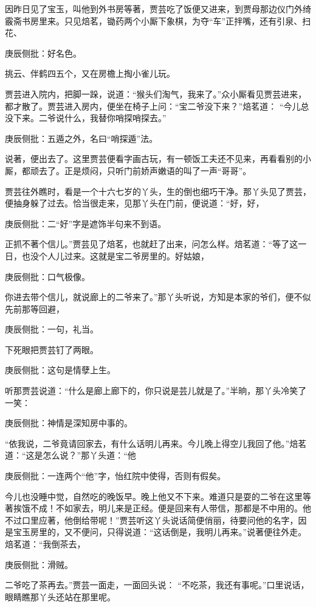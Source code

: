 \begin{parag}
    因昨日见了宝玉，叫他到外书房等著，贾芸吃了饭便又进来，到贾母那边仪门外绮霰斋书房里来。只见焙茗，锄药两个小厮下象棋，为夺“车”正拌嘴，还有引泉、扫花、\begin{note}庚辰侧批：好名色。\end{note}挑云、伴鹤四五个，又在房檐上掏小雀儿玩。
\end{parag}


\begin{parag}
    贾芸进入院内，把脚一跺，说道：“猴头们淘气，我来了。”众小厮看见贾芸进来，都才散了。贾芸进入房内，便坐在椅子上问：“宝二爷没下来？”焙茗道： “今儿总没下来。二爷说什么，我替你哨探哨探去。”\begin{note}庚辰侧批：五遁之外，名曰“哨探遁”法。\end{note}说著，便出去了。这里贾芸便看字画古玩，有一顿饭工夫还不见来，再看看别的小厮，都顽去了。正是烦闷，只听门前娇声嫩语的叫了一声“哥哥”。
\end{parag}


\begin{parag}
    贾芸往外瞧时，看是一个十六七岁的丫头，生的倒也细巧干净。那丫头见了贾芸，便抽身躲了过去。恰当很走来，见那丫头在门前，便说道：“好，好，\begin{note}庚辰侧批：二“好”字是遮饰半句来不到语。\end{note}正抓不著个信儿。”贾芸见了焙茗，也就赶了出来，问怎么样。焙茗道：“等了这一日，也没个人儿过来。这就是宝二爷房里的。好姑娘，\begin{note}庚辰侧批：口气极像。\end{note}你进去带个信儿，就说廊上的二爷来了。”那丫头听说，方知是本家的爷们，便不似先前那等回避，\begin{note}庚辰侧批：一句，礼当。\end{note}下死眼把贾芸钉了两眼。\begin{note}庚辰侧批：这句是情孽上生。\end{note}听那贾芸说道：“什么是廊上廊下的，你只说是芸儿就是了。”半晌，那丫头冷笑了一笑：\begin{note}庚辰侧批：神情是深知房中事的。\end{note}“依我说，二爷竟请回家去，有什么话明儿再来。今儿晚上得空儿我回了他。”焙茗道：“这是怎么说？”那丫头道：“他\begin{note}庚辰侧批：一连两个“他”字，怡红院中使得，否则有假矣。\end{note}今儿也没睡中觉，自然吃的晚饭早。晚上他又不下来。难道只是耍的二爷在这里等著挨饿不成！不如家去，明儿来是正经。便是回来有人带信，那都是不中用的。他不过口里应著，他倒给带呢！”贾芸听这丫头说话简便俏丽，待要问他的名字，因是宝玉房里的，又不便问，只得说道：“这话倒是，我明儿再来。”说著便往外走。焙茗道：“我倒茶去，\begin{note}庚辰侧批：滑贼。\end{note}二爷吃了茶再去。”贾芸一面走，一面回头说： “不吃茶，我还有事呢。”口里说话，眼睛瞧那丫头还站在那里呢。
\end{parag}


